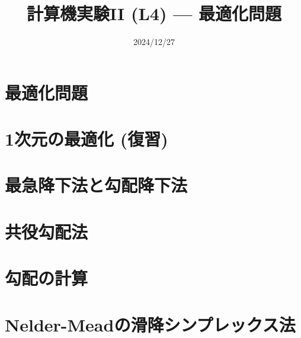 \documentclass[10pt,dvipdfmx]{beamer}
\title{計算機実験II (L4) --- 最適化問題}
\date{2024/12/27}
\begin{document}
\begin{frame}
  \titlepage
  \tableofcontents
\end{frame}

\section{最適化問題}




\section{1次元の最適化 (復習)}







\section{最急降下法と勾配降下法}




\section{共役勾配法}










\section{勾配の計算}














\section{Nelder-Meadの滑降シンプレックス法}
\end{document}
